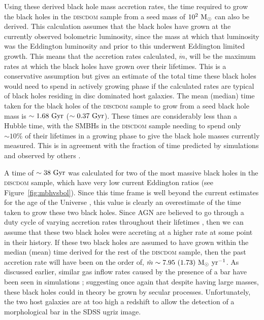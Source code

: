 {Using these derived black hole mass accretion rates, the time required to grow the black holes in the \textsc{discdom} sample from a seed mass of $10^2 ~\rm{M}_{\odot}$ can also be derived. This calculation assumes that the black holes have grown at the currently observed bolometric luminosity, since the mass at which that luminosity was the Eddington luminosity and prior to this underwent Eddington limited growth. This means that the accretion rates calculated, $\dot{m}$, will be the maximum rates at which the black holes have grown over their lifetimes. This is a conservative assumption but gives an estimate of the total time these black holes would need to spend in actively growing phase if the calculated rates are typical of black holes residing in disc dominated host galaxies. The mean (median) time taken for the black holes of the \textsc{discdom} sample to grow from a seed black hole mass is $\sim 1.68 ~\rm{Gyr}$ ($\sim 0.37 ~\rm{Gyr}$). These times are considerably less than a Hubble time, with the SMBHs in the \textsc{discdom} sample needing to spend only $\sim 10\%$ of their lifetimes in a growing phase to give the black hole masses currently measured. This is in agreement with the fraction of time predicted by simulations and observed by others \citep{kauffmann03, hao05, hopkins06, fiore12, Simmons13}.

A time of $\sim 38 ~\rm{Gyr}$ was calculated for two of the most massive black holes in the \textsc{discdom} sample, which have very low current Eddington ratios (see Figure~\ref{fig:mbhvsbol}). Since this time frame is well beyond the current estimates for the age of the Universe \citep[$\sim13.8 ~\rm{Gyr}$;][]{planck16}, this value is clearly an overestimate of the time taken to grow these two black holes. Since AGN are believed to go through a duty cycle of varying accretion rates throughout their lifetimes \citep{martini01, yu02, schawinski15}, then we can assume that these two black holes were accreting at a higher rate at some point in their history. If these two black holes are assumed to have grown within the median (mean) time derived for the rest of the \textsc{discdom} sample, then the past accretion rate will have been on the order of, $\dot{m} \sim 7.95 ~(1.73) ~\rm{M}_{\odot}~\rm{yr}^{-1}$. As discussed earlier, similar gas inflow rates caused by the presence of a bar have been seen in simulations \citep{friedli93}; suggesting once again that despite having large masses, these black holes could in theory be grown by secular processes. Unfortunately, the two host galaxies are at too high a redshift to allow the detection of a morphological bar in the SDSS ugriz image. 

}
